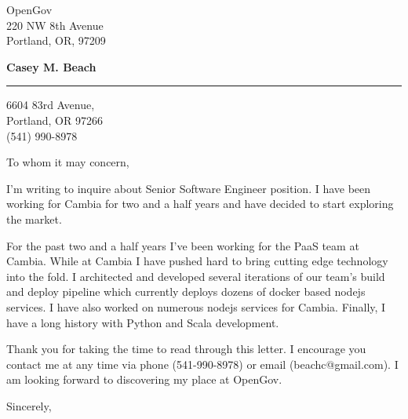 \documentclass{letter} %
\begin{document}
\signature{Casey M. Beach}           %
\longindentation=0pt                       %
\let\raggedleft\raggedright                %
 
 
\begin{letter}{
OpenGov \\
220 NW 8th Avenue \\
Portland, OR, 97209 \\
}

\begin{center}
{\large\bf Casey M. Beach}
\end{center}
\medskip\hrule height 1pt
\begin{center}
6604 83rd Avenue,\\
Portland, OR 97266 \\
(541) 990-8978 
\end{center} 
\vspace{1in}

 
\opening{To whom it may concern,} 
\begin{flushleft} 

\noindent I'm writing to inquire about Senior Software Engineer position. I have 
been working for Cambia for two and a half years and have decided to start exploring the market.

\noindent For the past two and a half years I've been working for the PaaS team at Cambia. While at Cambia I have pushed hard
to bring cutting edge technology into the fold. I architected and developed several iterations of our team's build and 
deploy pipeline which currently deploys dozens of docker based nodejs services. I have also worked on numerous nodejs services
for Cambia. Finally, I have a long history with Python and Scala development.

\noindent Thank you for taking the time to read through this letter. I encourage you
contact me at any time via phone (541-990-8978) or email (beachc@gmail.com). I am looking forward to 
discovering my place at OpenGov.

\end{flushleft}
\closing{Sincerely,} 
\vfill %
\end{letter}
\end{document}
